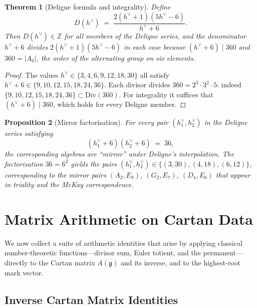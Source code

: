\documentclass[11pt]{amsart}
\theoremstyle{plain}
\newtheorem{theorem}{Theorem}[section]
\newtheorem{proposition}[theorem]{Proposition}
\theoremstyle{definition}
\theoremstyle{remark}
\begin{document}
\begin{theorem}[Deligne formula and integrality]\label{thm:deligne}
Define
\[
  D(h^{\vee}) \;=\; \frac{2(h^{\vee}+1)(5h^{\vee}-6)}{h^{\vee}+6}.
\]
Then $D(h^{\vee})\in\mathbb{Z}$ for all members of the Deligne series, and
the denominator $h^{\vee}+6$ divides $2(h^{\vee}+1)(5h^{\vee}-6)$ in each case
because $(h^{\vee}+6)\mid 360$ and $360=|A_6|$, the order of the alternating
group on six elements.
\end{theorem}

\begin{proof}
The values $h^{\vee}\in\{3,4,6,9,12,18,30\}$ all satisfy $h^{\vee}+6\in\{9,10,12,15,18,24,36\}$.
Each divisor divides $360=2^3\cdot 3^2\cdot 5$: indeed $\{9,10,12,15,18,24,36\}\subset\mathrm{Div}(360)$.
For integrality it suffices that $(h^{\vee}+6)\mid 360$, which holds for every
Deligne member.
\end{proof}

\begin{proposition}[Mirror factorisation]\label{prop:deligne-mirror}
For every pair $(h^{\vee}_1,h^{\vee}_2)$ in the Deligne series satisfying
\[
  (h^{\vee}_1+6)(h^{\vee}_2+6) \;=\; 36,
\]
the corresponding algebras are ``mirror'' under Deligne's interpolation.
The factorisation $36=6^2$ yields the pairs
$(h^{\vee}_1,h^{\vee}_2)\in\{(3,30),(4,18),(6,12)\}$,
corresponding to the mirror pairs $(A_2,E_8)$, $(G_2,E_7)$, $(D_4,E_6)$
that appear in triality and the McKay correspondence.
\end{proposition}

\section{Matrix Arithmetic on Cartan Data}\label{sec:cartan-matrix}

We now collect a suite of arithmetic identities that arise by applying
classical number-theoretic functions---divisor sum, Euler totient, and the
permanent---directly to the Cartan matrix $A(\mathfrak{g})$ and its inverse,
and to the highest-root mark vector.

\subsection{Inverse Cartan Matrix Identities}\label{sec:inv-cartan}
\end{document}
